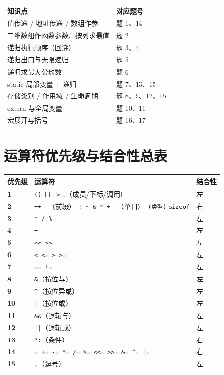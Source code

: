 \documentclass[UTF8,zihao=-4,a4paper]{ctexart}
\begin{document}
\begin{tipbox}[自测指路 · 第 5 章]
\begin{tabularx}{\linewidth}{p{5.6cm} X}
\toprule
知识点 & 对应题号\\
\midrule
值传递 / 地址传递 / 数组作参 & 题 1、14\\
二维数组作函数参数、按列求最值 & 题 2\\
递归执行顺序（回溯） & 题 3、4\\
递归出口与无限递归 & 题 5\\
递归求最大公约数 & 题 6\\
static 局部变量 + 递归 & 题 7、13、15\\
存储类别 / 作用域 / 生命周期 & 题 8、9、12、15\\
extern 与全局变量 & 题 10、11\\
宏展开与括号 & 题 16、17\\
\bottomrule
\end{tabularx}
\end{tipbox}


\appendix
\section{运算符优先级与结合性总表}

\begin{center}\small
\begin{longtable}{>{\bfseries}p{1.0cm} p{8.6cm} >{\raggedright\arraybackslash}p{3.6cm}}
\toprule
优先级 & 运算符 & 结合性\\
\midrule
\endhead
1 & \texttt{()} \texttt{[]} \texttt{->} \texttt{.}（成员/下标/调用） & 左\\
2 & \texttt{++ --}（前缀）\ \texttt{! \textasciitilde}\ \texttt{\& * + -}（单目）\ \texttt{(类型)} \texttt{sizeof} & 右\\
3 & \texttt{* / \%} & 左\\
4 & \texttt{+ -} & 左\\
5 & \texttt{<< >>} & 左\\
6 & \texttt{< <= > >=} & 左\\
7 & \texttt{== !=} & 左\\
8 & \texttt{\&}（按位与） & 左\\
9 & \texttt{\^{}}（按位异或） & 左\\
10 & \texttt{|}（按位或） & 左\\
11 & \texttt{\&\&}（逻辑与） & 左\\
12 & \texttt{||}（逻辑或） & 左\\
13 & \texttt{?:}（条件） & 右\\
14 & \texttt{= += -= *= /= \%= <<= >>= \&= \^{}= |=} & 右\\
15 & \texttt{,}（逗号） & 左\\
\bottomrule
\end{longtable}
\end{center}
\end{document}
